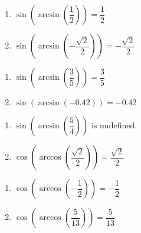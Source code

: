 \begin{multicols}{2}

\begin{enumerate}

\setcounter{enumi}{\value{HW}}

\item $\sin\left(\arcsin\left(\dfrac{1}{2}\right)\right) = \dfrac{1}{2}$ 
\item $\sin\left(\arcsin\left(-\dfrac{\sqrt{2}}{2}\right)\right) = -\dfrac{\sqrt{2}}{2}$

\setcounter{HW}{\value{enumi}}

\end{enumerate}

\end{multicols}

\begin{multicols}{2}

\begin{enumerate}

\setcounter{enumi}{\value{HW}}

\item $\sin\left(\arcsin\left(\dfrac{3}{5}\right)\right) = \dfrac{3}{5}$
\item $\sin\left(\arcsin\left(-0.42\right)\right) = -0.42$ 

\setcounter{HW}{\value{enumi}}

\end{enumerate}

\end{multicols}

\begin{multicols}{2}

\begin{enumerate}

\setcounter{enumi}{\value{HW}}

\item $\sin\left(\arcsin\left(\dfrac{5}{4}\right)\right)$ is undefined. 
\item $\cos\left(\arccos\left(\dfrac{\sqrt{2}}{2}\right)\right) = \dfrac{\sqrt{2}}{2}$

\setcounter{HW}{\value{enumi}}

\end{enumerate}

\end{multicols}

\begin{multicols}{2}

\begin{enumerate}

\setcounter{enumi}{\value{HW}}

\item $\cos\left(\arccos\left(-\dfrac{1}{2}\right)\right) = -\dfrac{1}{2}$
\item $\cos\left(\arccos\left(\dfrac{5}{13}\right)\right) = \dfrac{5}{13}$

\setcounter{HW}{\value{enumi}}

\end{enumerate}

\end{multicols}

